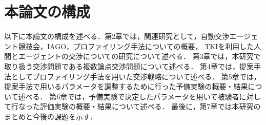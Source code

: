 \section{本論文の構成}
以下に本論文の構成を述べる．第2章では，関連研究として，自動交渉エージェント競技会，IAGO，プロファイリング手法についての概要，
TKIを利用した人間とエージェントの交渉についての研究について述べる．
第3章では，本研究で取り扱う交渉問題である複数論点交渉問題について述べる．
第4章では，提案手法としてプロファイリング手法を用いた交渉戦略について述べる．
第5章では，提案手法で用いるパラメータを調整するために行った予備実験の概要・結果について述べる．
第6章では，予備実験で決定したパラメータを用いて被験者に対して行なった評価実験の概要・結果について述べる．
最後に，第7章では本研究のまとめと今後の課題を示す．

